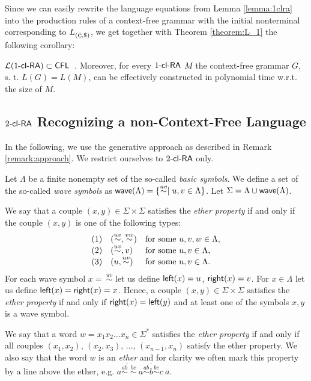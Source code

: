 Since we can easily rewrite the language equations from Lemma \ref{lemma:1clra}
into the production rules of a context-free grammar with the initial nonterminal corresponding to $L_{({\small \cent},\$)}$,
we get together with Theorem \ref{theorem:L_1} the following corollary:

\begin{corollary}\label{corollary:1clra_cfl}
$\calL{\kclRA[1]} \subset \CFL$\ . Moreover, for every $\kclRA[1]$ $M$ the context-free grammar $G$, s. t. $L(G) = L(M)$, can be effectively constructed in polynomial time w.r.t. the size of $M$.
\end{corollary}

\subsection{$\kclRA[2]$ Recognizing a non-Context-Free Language}\label{2clRA-non-CFL}

In the following, we use the generative approach as described in Remark \ref{remark:approach}. We restrict ourselves to $\kclRA[2]$ only.

\begin{definition}\label{definition:ether}
Let $\Lambda$ be a finite nonempty set of the so-called \emph{basic symbols}. We define a set of the so-called \emph{wave symbols} as $\wave(\Lambda) = \{\stackrel{uv}{\sim} \mid u,v \in \Lambda\}$. Let $\Sigma = \Lambda \cup \wave(\Lambda)$.

We say that a couple $(x, y) \in \Sigma \times \Sigma$ satisfies the \emph{ether property} if and only if the couple $(x, y)$ is one of the following types:
$$
\begin{array}{ll}
(1) \quad (\stackrel{uv}{\sim}, \stackrel{vw}{\sim}) 	& \textup{for some } u, v, w \in \Lambda,\\
(2) \quad (\stackrel{uv}{\sim}, v)					& \textup{for some } u, v \in \Lambda,\\
(3) \quad (u, \stackrel{uv}{\sim})					& \textup{for some } u, v \in \Lambda.
\end{array}
$$
For each wave symbol $x =\ \stackrel{uv}{\sim}$ let us define ${\sf left}(x) = u$, ${\sf right}(x) = v$. For $x \in \Lambda$ let us define ${\sf left}(x) = {\sf right}(x) = x$. Hence, a couple $(x, y) \in \Sigma \times \Sigma$ satisfies the \emph{ether property} if and only if ${\sf right}(x) = {\sf left}(y)$ and at least one of the symbols $x, y$ is a wave symbol.

We say that a word $w = x_1 x_2 \ldots x_n \in \Sigma^*$ satisfies the \emph{ether property} if and only if all couples $(x_1, x_2)$, $(x_2, x_3)$, ..., $(x_{n-1}, x_n)$ satisfy the ether property. We also say that the word $w$ is an \emph{ether} and for clarity we often mark this property by a line above the ether, e.g. $\overline{a \stackrel{ab}{\sim} \; \stackrel{bc}{\sim}}\ \overline{a \stackrel{ab}{\sim} b \stackrel{bc}{\sim} c}\ a$.
\end{definition}

